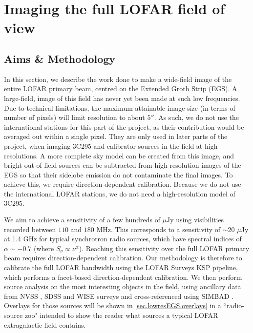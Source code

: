 \chapter{Imaging the full LOFAR field of view}\label{section.EGS.lowres}
\minitoc
\section{Aims \& Methodology}

\pg
In this section, we describe the work done to make a wide-field image of the entire LOFAR primary beam, centred on the Extended Groth Strip (EGS). A large-field, image of this field has never yet been made at such low frequencies. Due to technical limitations, the maximum attainable image size (in terms of number of pixels) will limit resolution to about $5''$. As such, we do not use the international stations for this part of the project, as their contribution would be averaged out within a single pixel. They are only used in later parts of the project, when imaging 3C295 and calibrator sources in the field at high resolutions.
A more complete sky model can be created from this image, and %
bright out-of-field sources can be subtracted from high-resolution images of the EGS so that their sidelobe emission do not contaminate the final images. %
To achieve this, we require direction-dependent calibration. Because we do not use the international LOFAR stations, we do not need a high-resolution model of 3C295. 

\pg
We aim to achieve a sensitivity of a few hundreds of $\mu$Jy using visibilities recorded between $110$ and $180$ MHz. This corresponds to a sensitivity of $\sim20$ $\mu$Jy at 1.4 GHz for typical synchrotron radio sources, which have spectral indices of $\alpha\sim -0.7$ (where $S_\nu \propto \nu^\alpha$). Reaching this sensitivity over the full LOFAR primary beam requires direction-dependent calibration.
Our methodology is therefore to calibrate the full LOFAR bandwidth using the LOFAR Surveys KSP pipeline, which performs a facet-based direction-dependent calibration. We then perform source analysis on the most interesting objects in the field, using ancillary data from NVSS , SDSS  and WISE  surveys and cross-referenced using SIMBAD . Overlays for those sources will be shown in \cref{sec.lowresEGS.overlays} in a ``radio-source zoo" intended to show the reader what sources a typical LOFAR extragalactic field contains.


